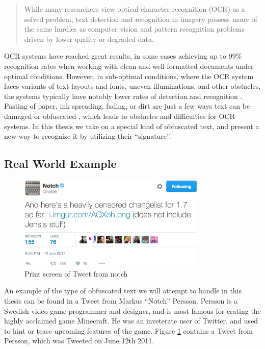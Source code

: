 \begin{quote}
    While many researchers view optical character recognition (OCR) as a solved problem, text detection and recognition in imagery possess many of the same hurdles as computer vision and pattern recognition problems driven by lower quality or degraded data.
\end{quote}

OCR systems have reached great results, in some cases achieving up to 99\% recognition rates when working with clean and well-formatted documents under optimal conditions. However, in sub-optimal conditions, where the OCR system faces variants of text layouts and fonts, uneven illuminations, and other obstacles, the systems typically have notably lower rates of detection and recognition \citep{ye2015text}. Pasting of paper, ink spreading, fading, or dirt are just a few ways text can be damaged or obfuscated \citep{bhardwaj2014imaging}, which leads to obstacles and difficulties for OCR systems. In this thesis we take on a special kind of obfuscated text, and present a new way to recognize it by utilizing their ``signature''.

\subsection{Real World Example}
\begin{figure}[ht]
    \centering
    \includegraphics[width=0.8\textwidth]{fig/chapter1/notch_tweet.jpg}
    \caption{Print screen of Tweet from notch}
    \label{ref:notch_twitter}
\end{figure}

An example of the type of obfuscated text we will attempt to handle in this thesis can be found in a Tweet from Markus ``Notch'' Persson. Persson is a Swedish video game programmer and designer, and is most famous for crating the highly acclaimed game Minecraft. He was an inveterate user of Twitter, and used to hint or tease upcoming features of the game. Figure \ref{ref:notch_twitter} contains a Tweet from Persson, which was Tweeted on June 12th 2011.

